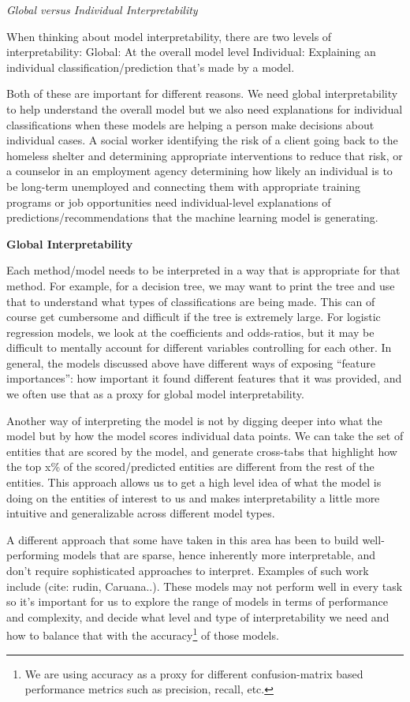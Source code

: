 \documentclass[]{krantz}
\begin{document}
\emph{Global versus Individual Interpretability}

When thinking about model interpretability, there are two levels of
interpretability: Global: At the overall model level Individual:
Explaining an individual classification/prediction that's made by a
model.

Both of these are important for different reasons. We need global
interpretability to help understand the overall model but we also need
explanations for individual classifications when these models are
helping a person make decisions about individual cases. A social worker
identifying the risk of a client going back to the homeless shelter and
determining appropriate interventions to reduce that risk, or a
counselor in an employment agency determining how likely an individual
is to be long-term unemployed and connecting them with appropriate
training programs or job opportunities need individual-level
explanations of predictions/recommendations that the machine learning
model is generating.

\textbf{Global Interpretability}

Each method/model needs to be interpreted in a way that is appropriate
for that method. For example, for a decision tree, we may want to print
the tree and use that to understand what types of classifications are
being made. This can of course get cumbersome and difficult if the tree
is extremely large. For logistic regression models, we look at the
coefficients and odds-ratios, but it may be difficult to mentally
account for different variables controlling for each other. In general,
the models discussed above have different ways of exposing ``feature
importances'': how important it found different features that it was
provided, and we often use that as a proxy for global model
interpretability.

Another way of interpreting the model is not by digging deeper into what
the model but by how the model scores individual data points. We can
take the set of entities that are scored by the model, and generate
cross-tabs that highlight how the top x\% of the scored/predicted
entities are different from the rest of the entities. This approach
allows us to get a high level idea of what the model is doing on the
entities of interest to us and makes interpretability a little more
intuitive and generalizable across different model types.

A different approach that some have taken in this area has been to build
well-performing models that are sparse, hence inherently more
interpretable, and don't require sophisticated approaches to interpret.
Examples of such work include (cite: rudin, Caruana..). These models may
not perform well in every task so it's important for us to explore the
range of models in terms of performance and complexity, and decide what
level and type of interpretability we need and how to balance that with
the
accuracy\footnote{We are using accuracy as a proxy for different confusion-matrix based performance metrics such as precision, recall, etc.}
of those models.
\end{document}
